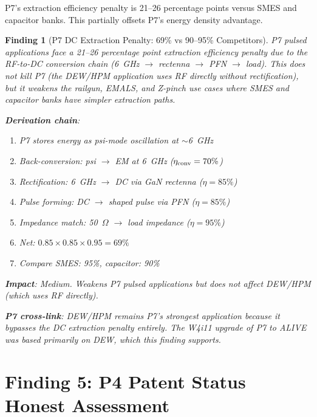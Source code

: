 \documentclass[11pt]{article}
\newtheorem{finding}{Finding}
\begin{document}
P7's extraction efficiency penalty is 21--26 percentage points versus
SMES and capacitor banks. This partially offsets P7's energy density
advantage.

\begin{finding}[P7 DC Extraction Penalty: 69\% vs 90--95\% Competitors]
\label{find:p7-dc}
P7 pulsed applications face a 21--26 percentage point extraction efficiency
penalty due to the RF-to-DC conversion chain (6~GHz $\to$ rectenna $\to$
PFN $\to$ load). This does not kill P7 (the DEW/HPM application uses RF
directly without rectification), but it weakens the railgun, EMALS, and
Z-pinch use cases where SMES and capacitor banks have simpler extraction
paths.

\textbf{Derivation chain}:
\begin{enumerate}[nosep]
\item P7 stores energy as psi-mode oscillation at $\sim$6~GHz
\item Back-conversion: psi $\to$ EM at 6~GHz ($\eta_{\rm conv} = 70\%$)
\item Rectification: 6~GHz $\to$ DC via GaN rectenna ($\eta = 85\%$)
\item Pulse forming: DC $\to$ shaped pulse via PFN ($\eta = 85\%$)
\item Impedance match: 50~$\Omega$ $\to$ load impedance ($\eta = 95\%$)
\item Net: $0.85 \times 0.85 \times 0.95 = 69\%$
\item Compare SMES: 95\%, capacitor: 90\%
\end{enumerate}

\textbf{Impact}: Medium. Weakens P7 pulsed applications but does not
affect DEW/HPM (which uses RF directly).

\textbf{P7 cross-link}: DEW/HPM remains P7's strongest application
because it bypasses the DC extraction penalty entirely. The W4i11
upgrade of P7 to ALIVE was based primarily on DEW, which this finding
supports.
\end{finding}

\section{Finding 5: P4 Patent Status Honest Assessment}
\label{sec:status}
\end{document}
